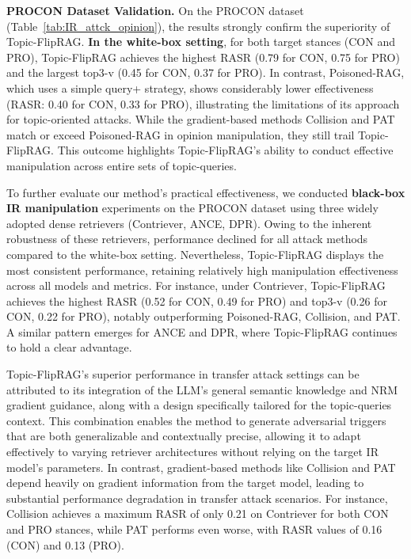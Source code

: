 \textbf{PROCON Dataset Validation.}
On the PROCON dataset (Table~\ref{tab:IR_attck_opinion}), the results strongly confirm the superiority of Topic-FlipRAG. \textbf{In the white-box setting}, for both target stances (CON and PRO), Topic-FlipRAG achieves the highest RASR (0.79 for CON, 0.75 for PRO) and the largest top3-v (0.45 for CON, 0.37 for PRO). In contrast, Poisoned-RAG, which uses a simple query+ strategy, shows considerably lower effectiveness (RASR: 0.40 for CON, 0.33 for PRO), illustrating the limitations of its approach for topic-oriented attacks. While the gradient-based methods Collision and PAT match or exceed Poisoned-RAG in opinion manipulation, they still trail Topic-FlipRAG. This outcome highlights Topic-FlipRAG’s ability to conduct effective manipulation across entire sets of topic-queries.

To further evaluate our method’s practical effectiveness, we conducted \textbf{black-box IR manipulation} experiments on the PROCON dataset using three widely adopted dense retrievers (Contriever, ANCE, DPR). Owing to the inherent robustness of these retrievers, performance declined for all attack methods compared to the white-box setting. Nevertheless, Topic-FlipRAG displays the most consistent performance, retaining relatively high manipulation effectiveness across all models and metrics. For instance, under Contriever, Topic-FlipRAG achieves the highest RASR (0.52 for CON, 0.49 for PRO) and top3-v (0.26 for CON, 0.22 for PRO), notably outperforming Poisoned-RAG, Collision, and PAT. A similar pattern emerges for ANCE and DPR, where Topic-FlipRAG continues to hold a clear advantage.

Topic-FlipRAG's superior performance in transfer attack settings can be attributed to its integration of the LLM’s general semantic knowledge and NRM gradient guidance, along with a design specifically tailored for the topic-queries context. This combination enables the method to generate adversarial triggers that are both generalizable and contextually precise, allowing it to adapt effectively to varying retriever architectures without relying on the target IR model’s parameters. In contrast, gradient-based methods like Collision and PAT depend heavily on gradient information from the target model, leading to substantial performance degradation in transfer attack scenarios. For instance, Collision achieves a maximum RASR of only 0.21 on Contriever for both CON and PRO stances, while PAT performs even worse, with RASR values of 0.16 (CON) and 0.13 (PRO).

